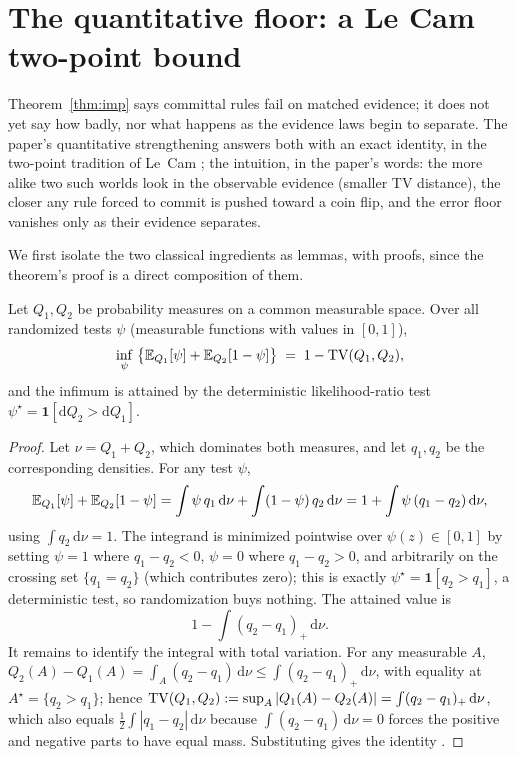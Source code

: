 \section{The quantitative floor: a Le Cam two-point bound}\label{sec:t1-lecam}

Theorem~\ref{thm:imp} says committal rules fail on matched evidence; it
does not yet say how badly, nor what happens as the evidence laws begin to
separate. The paper's quantitative strengthening answers both with an exact
identity, in the two-point tradition of Le~Cam \cite{lecam1973convergence};
the intuition, in the paper's words: the more alike two such worlds look in
the observable evidence (smaller TV distance), the closer any rule forced
to commit is pushed toward a coin flip, and the error floor vanishes only
as their evidence separates.

We first isolate the two classical ingredients as lemmas, with proofs,
since the theorem's proof is a direct composition of them.

\begin{lemma}\label{lem:t1-affinity}
Let $Q_1,Q_2$ be probability measures on a common measurable space. Over
all randomized tests $\psi$ (measurable functions with values in $[0,1]$),
\[
\inf_{\psi}\;\bigl\{\mathbb{E}_{Q_1}[\psi]+\mathbb{E}_{Q_2}[1-\psi]\bigr\}
\;=\;1-\mathrm{TV}(Q_1,Q_2),
\]
and the infimum is attained by the deterministic likelihood-ratio test
$\psi^\star=\mathbf1[\mathrm dQ_2>\mathrm dQ_1]$.
\end{lemma}

\begin{proof}
Let $\nu=Q_1+Q_2$, which dominates both measures, and let $q_1,q_2$ be the
corresponding densities. For any test $\psi$,
\[
\mathbb{E}_{Q_1}[\psi]+\mathbb{E}_{Q_2}[1-\psi]
=\int\psi\,q_1\,\mathrm d\nu+\int(1-\psi)\,q_2\,\mathrm d\nu
=1+\int\psi\,(q_1-q_2)\,\mathrm d\nu,
\]
using $\int q_2\,\mathrm d\nu=1$. The integrand is minimized pointwise over
$\psi(z)\in[0,1]$ by setting $\psi=1$ where $q_1-q_2<0$, $\psi=0$ where
$q_1-q_2>0$, and arbitrarily on the crossing set $\{q_1=q_2\}$ (which
contributes zero); this is exactly $\psi^\star=\mathbf1[q_2>q_1]$, a
deterministic test, so randomization buys nothing. The attained value is
\[
1-\int (q_2-q_1)_+\,\mathrm d\nu .
\]
It remains to identify the integral with total variation. For any
measurable $A$,
$Q_2(A)-Q_1(A)=\int_A(q_2-q_1)\,\mathrm d\nu\le\int(q_2-q_1)_+\,\mathrm
d\nu$, with equality at $A^\star=\{q_2>q_1\}$; hence
$\mathrm{TV}(Q_1,Q_2):=\sup_A|Q_1(A)-Q_2(A)|=\int(q_2-q_1)_+\,\mathrm d\nu$, which
also equals $\tfrac12\int|q_1-q_2|\,\mathrm d\nu$ because
$\int(q_2-q_1)\,\mathrm d\nu=0$ forces the positive and negative parts to
have equal mass. Substituting gives the identity
\cite{lecam1973convergence, tsybakov2009introduction, lehmann2005testing}.
\end{proof}

